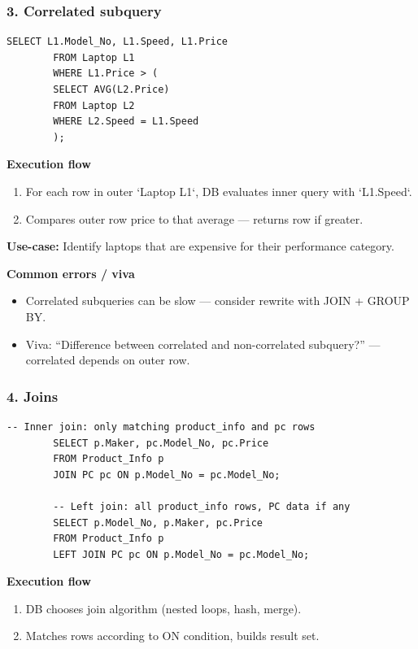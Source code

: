 \documentclass[11pt,a4paper]{article}
\begin{document}
	\bigskip
	\subsubsection*{3. Correlated subquery}
	\begin{lstlisting}[caption={Laptops priced above the average price for the same speed}]
		SELECT L1.Model_No, L1.Speed, L1.Price
		FROM Laptop L1
		WHERE L1.Price > (
		SELECT AVG(L2.Price) 
		FROM Laptop L2 
		WHERE L2.Speed = L1.Speed
		);
	\end{lstlisting}
	
	\textbf{Execution flow}
	\begin{enumerate}[noitemsep]
		\item For each row in outer `Laptop L1`, DB evaluates inner query with `L1.Speed`.  
		\item Compares outer row price to that average — returns row if greater.  
	\end{enumerate}
	
	\textbf{Use-case:} Identify laptops that are expensive for their performance category.
	
	\textbf{Common errors / viva}
	\begin{itemize}[noitemsep]
		\item Correlated subqueries can be slow — consider rewrite with JOIN + GROUP BY.  
		\item Viva: ``Difference between correlated and non-correlated subquery?'' — correlated depends on outer row.
	\end{itemize}
	
	\bigskip
	\subsubsection*{4. Joins}
	\begin{lstlisting}[caption={Inner join and Left join examples}]
		-- Inner join: only matching product_info and pc rows
		SELECT p.Maker, pc.Model_No, pc.Price
		FROM Product_Info p
		JOIN PC pc ON p.Model_No = pc.Model_No;
		
		-- Left join: all product_info rows, PC data if any
		SELECT p.Model_No, p.Maker, pc.Price
		FROM Product_Info p
		LEFT JOIN PC pc ON p.Model_No = pc.Model_No;
	\end{lstlisting}
	
	\textbf{Execution flow}
	\begin{enumerate}[noitemsep]
		\item DB chooses join algorithm (nested loops, hash, merge).  
		\item Matches rows according to ON condition, builds result set.
	\end{enumerate}
	
\end{document}
